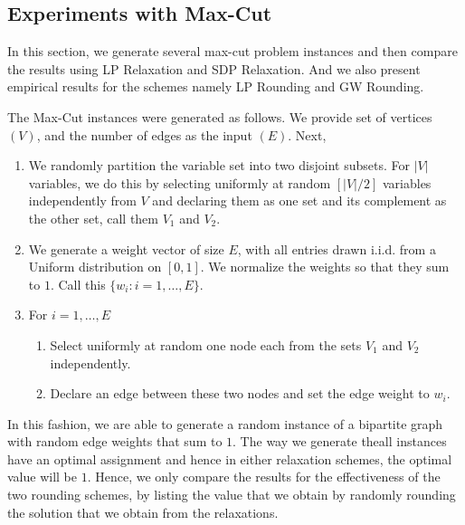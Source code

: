 \subsection{Experiments with Max-Cut}
In this section, we generate several max-cut problem instances and then compare the results using LP Relaxation and SDP Relaxation. And we also present empirical results for the schemes namely LP Rounding and GW Rounding. 

The Max-Cut instances were generated as follows. We provide set of vertices $(V)$, and the number of edges as the input $(E)$. Next, 
\begin{enumerate}
	\item We randomly partition the variable set into two disjoint subsets. For $|V|$ variables, we do this by selecting uniformly at random $[|V|/2]$ variables independently from $V$ and declaring them as one set and its complement as the other set, call them $V_1$ and $V_2$. 
	\item We generate a weight vector of size $E$, with all entries drawn i.i.d. from a Uniform distribution on $[0, 1]$. We normalize the weights so that they sum to $1$. Call this $\{ w_i : i = 1, \ldots, E\}$.
	\item For $i=1, \ldots, E$ 
	\begin{enumerate}
		\item  Select uniformly at random one node each from the sets $V_1$ and $V_2$ independently. 
		\item Declare an edge between these two nodes and set the edge weight to $w_{i}$.
	\end{enumerate}
\end{enumerate}
In this fashion, we are able to generate a random instance of a bipartite graph with random edge weights that sum to $1$. The way we generate theall instances have an optimal assignment and  hence in either relaxation schemes, the optimal value will be $1$. Hence, we only compare the results for the effectiveness of the two rounding schemes, by listing the value that we obtain by randomly rounding the solution that we obtain from the relaxations. 



